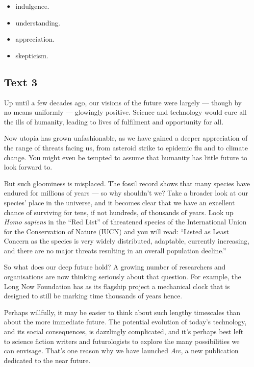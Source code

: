 \documentclass[UTF8,11pt]{ctexart}
\begin{document}
\begin{itemize}[leftmargin=2em,itemsep=.2em,topsep=.4em]\item[A.] indulgence.
\item[B.] understanding.
\item[C.] appreciation.
\item[D.] skepticism.
\end{itemize}

\subsection*{\textbf{Text 3}}


Up until a few decades ago, our visions of the future were largely — though by no means uniformly — glowingly positive. Science and technology would cure all the ills of humanity, leading to lives of fulfilment and opportunity for all.


Now utopia has grown unfashionable, as we have gained a deeper appreciation of the range of threats facing us, from asteroid strike to epidemic flu and to climate change. You might even be tempted to assume that humanity has little future to look forward to.


But such gloominess is misplaced. The fossil record shows that many species have endured for millions of years — so why shouldn’t we? Take a broader look at our species’ place in the universe, and it becomes clear that we have an excellent chance of surviving for tens, if not hundreds, of thousands of years. Look up \textit{Homo sapiens} in the “Red List” of threatened species of the International Union for the Conservation of Nature (IUCN) and you will read: “Listed as Least Concern as the species is very widely distributed, adaptable, currently increasing, and there are no major threats resulting in an overall population decline.”


So what does our deep future hold? A growing number of researchers and organisations are now thinking seriously about that question. For example, the Long Now Foundation has as its flagship project a mechanical clock that is designed to still be marking time thousands of years hence.


Perhaps willfully, it may be easier to think about such lengthy timescales than about the more immediate future. The potential evolution of today’s technology, and its social consequences, is dazzlingly complicated, and it’s perhaps best left to science fiction writers and futurologists to explore the many possibilities we can envisage. That’s one reason why we have launched \textit{Arc}, a new publication dedicated to the near future.
\end{document}
